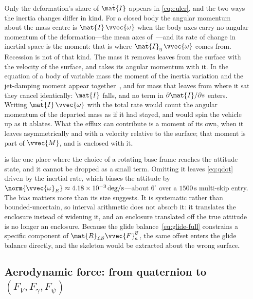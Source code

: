 \begin{remark}\label{rem:euler-mass-loss}
Only the deformation's share of $\dot{\mat{I}}$ appears in \cref{eq:euler},
and the two ways the inertia changes differ in kind. For a closed body the
angular momentum about the mass centre is $\mat{I}\,\vvec{\omega}$ when the
body axes carry no angular momentum of the deformation---the mean axes
of~\cite{canavin1977floating}---and its rate of change in inertial space is
the moment: that is where $\dot{\mat{I}}_{\eta}\,\vvec{\omega}$ comes from.
Recession is not of that kind. The mass it removes leaves from the surface
with the velocity of the surface, and takes its angular momentum with it. In
the equation of a body of variable mass the moment of the inertia variation
and the jet-damping moment appear together~\cite[Eq.~(61)]{eke2002dynamics},
and for mass that leaves from where it sat they cancel identically:
$\mat{I}$ falls, and no term in $\partial\mat{I}/\partial s$ enters.
Writing $\dot{\mat{I}}\,\vvec{\omega}$ with the total rate would count the
angular momentum of the departed mass as if it had stayed, and would spin
the vehicle up as it ablates. What the efflux can contribute is a moment of
its own, when it leaves asymmetrically and with a velocity relative to the
surface; that moment is part of $\vvec{M}$, and is enclosed with it.
\end{remark}

\begin{remark}\label{rem:omega-transport}
 is the one place where the choice of a rotating base
frame reaches the attitude state, and it cannot be dropped as a small
term. Omitting it leaves \cref{eq:qdot} driven by the inertial rate, which
biases the attitude by $\norm{\vvec{\omega}_E} \approx
4.18\times10^{-3}\,\mathrm{deg/s}$---about $6^\circ$ over a
$1500\,\mathrm{s}$ multi-skip entry. The bias matters more than its size
suggests. It is systematic rather than bounded-uncertain, so interval
arithmetic does not absorb it: it translates the enclosure instead of
widening it, and an enclosure translated off the true attitude is no longer
an enclosure. Because the glide
balance~\cref{eq:glide-full} constrains a specific component of
$\mat{R}_{\mathcal{L}\mathcal{B}}\vvec{F}_a^{\mathcal{B}}$, the same offset
enters the glide balance directly, and the skeleton would be extracted
about the wrong surface.
\end{remark}


\subsection{Aerodynamic force: from quaternion to
  \texorpdfstring{$(F_V,F_\gamma,F_\psi)$}
  {(FV, Fgamma, Fpsi)}}\label{sec:aero-force}

